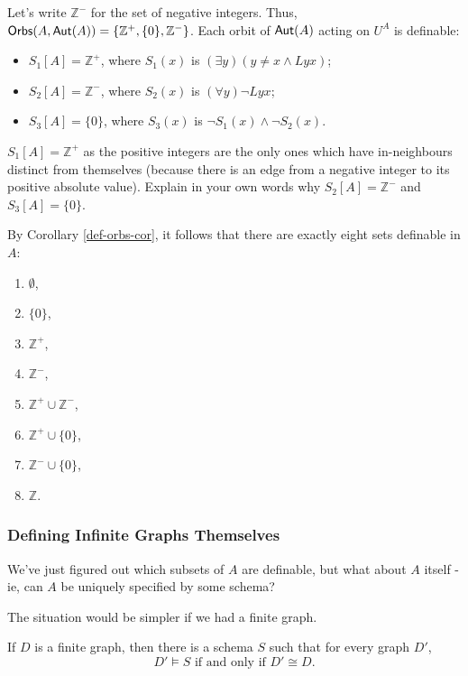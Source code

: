 Let's write $\mathbb{Z}^-$ for the set of negative integers. Thus, $\mbox{$\mathsf{Orbs}(A,\mbox{$\mathsf{Aut}(A)$})$}= \{\mathbb{Z}^+,\{0\},\mathbb{Z}^-\}$. Each orbit of $\mbox{$\mathsf{Aut}(A)$}$ acting on $U^A$ is definable:
\begin{itemize}
\item 
$S_1[A] = \mathbb{Z}^+$, where $S_1(x)$ is $(\exists y)(y\neq x \wedge Lyx)$;
\item 
$S_2[A] = \mathbb{Z}^-$, where $S_2(x)$ is $(\forall y)\neg Lyx$;
\item 
$S_3[A] = \{0\}$, where $S_3(x)$ is $\neg S_1(x)\wedge\neg S_2(x)$.
\end{itemize} 

\begin{aside}
    $S_1[A] = \mathbb{Z}^+$ as the positive integers are the only ones which have in-neighbours distinct from themselves (because there is an edge from a negative integer to its positive absolute value). Explain in your own words why $S_2[A] = \mathbb{Z}^-$ and $S_3[A] = \{0\}$. 
\end{aside}

By Corollary \ref{def-orbs-cor}, it follows that there are exactly eight sets definable in $A$:
\begin{enumerate}
\item $\emptyset$,
\item $\{0\}$,
\item $\mathbb{Z}^+$,
\item $\mathbb{Z}^-$,
\item $\mathbb{Z}^+\cup\mathbb{Z}^-$,
\item $\mathbb{Z}^+\cup\{0\}$,
\item $\mathbb{Z}^-\cup\{0\}$,
\item $\mathbb{Z}$.
\end{enumerate}

\subsubsection*{Defining Infinite Graphs Themselves}
We've just figured out which subsets of $A$ are definable, but what about $A$ itself - ie, can $A$ be uniquely specified by some schema?

The situation would be simpler if we had a finite graph.
\begin{theorem}
If $D$ is a finite graph, then there is a schema $S$ such that for every graph $D'$, 
\[
D'\models S \mbox{ if and only if } D'\cong D.
\]
\end{theorem}

